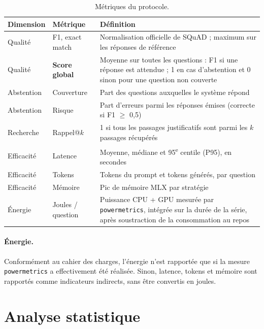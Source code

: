 \documentclass[11pt,a4paper]{article}
\begin{document}
\begin{table}[H]
\centering\small
\begin{tabularx}{\textwidth}{l l Y}
\toprule
\textbf{Dimension} & \textbf{Métrique} & \textbf{Définition} \\
\midrule
Qualité & F1, exact match & Normalisation officielle de SQuAD ; maximum sur les réponses de référence \\
Qualité & \textbf{Score global} & Moyenne sur toutes les questions : F1 si une réponse est attendue ; 1 en cas d'abstention et 0 sinon pour une question non couverte \\
Abstention & Couverture & Part des questions auxquelles le système répond \\
Abstention & Risque & Part d'erreurs parmi les réponses émises (correcte si F1 $\geq$ 0,5) \\
Recherche & Rappel@$k$ & 1 si tous les passages justificatifs sont parmi les $k$ passages récupérés \\
Efficacité & Latence & Moyenne, médiane et 95\textsuperscript{e} centile (P95), en secondes \\
Efficacité & Tokens & Tokens du prompt et tokens générés, par question \\
Efficacité & Mémoire & Pic de mémoire MLX par stratégie \\
Énergie & Joules / question & Puissance CPU + GPU mesurée par \texttt{powermetrics}, intégrée sur la durée de la série, après soustraction de la consommation au repos \\
\bottomrule
\end{tabularx}
\caption{Métriques du protocole.}
\label{tab:metriques}
\end{table}

\paragraph{Énergie.} Conformément au cahier des charges, l'énergie n'est rapportée que si la mesure
\texttt{powermetrics} a effectivement été réalisée. Sinon, latence, tokens et mémoire sont rapportés
comme indicateurs indirects, sans être convertis en joules.

\section{Analyse statistique}\label{sec:stats}
\end{document}
